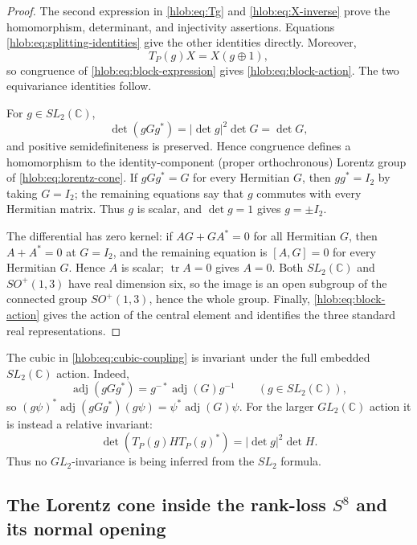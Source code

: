 \begin{proof}
The second expression in \eqref{hlob:eq:Tg} and
\eqref{hlob:eq:X-inverse} prove the homomorphism, determinant, and
injectivity assertions.  Equations \eqref{hlob:eq:splitting-identities}
give the other identities directly.  Moreover,
\[
 T_P(g)X=X(g\oplus1),
\]
so congruence of \eqref{hlob:eq:block-expression} gives
\eqref{hlob:eq:block-action}.  The two equivariance identities follow.

For \(g\in SL_2(\mathbb C)\),
\[
 \det(gGg^*)=|\det g|^2\det G=\det G,
\]
and positive semidefiniteness is preserved.  Hence congruence defines a
homomorphism to the identity-component (proper orthochronous) Lorentz group of
\eqref{hlob:eq:lorentz-cone}.  If \(gGg^*=G\) for every Hermitian \(G\),
then \(gg^*=I_2\) by taking \(G=I_2\); the remaining equations say that \(g\)
commutes with every Hermitian matrix.  Thus \(g\) is scalar, and
\(\det g=1\) gives \(g=\pm I_2\).

The differential has zero kernel: if
\(AG+GA^*=0\) for all Hermitian \(G\), then \(A+A^*=0\) at \(G=I_2\), and
the remaining equation is \([A,G]=0\) for every Hermitian \(G\).  Hence \(A\)
is scalar; \(\operatorname{tr}A=0\) gives \(A=0\).  Both
\(SL_2(\mathbb C)\) and \(SO^+(1,3)\) have real dimension six, so the image
is an open subgroup of the connected group \(SO^+(1,3)\), hence the whole
group.  Finally, \eqref{hlob:eq:block-action} gives the action of the
central element and identifies the three standard real representations.
\end{proof}

The cubic in \eqref{hlob:eq:cubic-coupling} is invariant under the full
embedded \(SL_2(\mathbb C)\) action.  Indeed,
\begin{equation}
 \operatorname{adj}(gGg^*)=g^{-*}\operatorname{adj}(G)g^{-1}
 \qquad(g\in SL_2(\mathbb C)),
 \label{hlob:eq:adjugate-covariance}
\end{equation}
so
\((g\psi)^*\operatorname{adj}(gGg^*)(g\psi)
=\psi^*\operatorname{adj}(G)\psi\).
For the larger \(GL_2(\mathbb C)\) action it is instead a relative invariant:
\begin{equation}
 \det\!\left(T_P(g)HT_P(g)^*\right)
 =|\det g|^2\det H.
 \label{hlob:eq:GL2-relative-invariant}
\end{equation}
Thus no \(GL_2\)-invariance is being inferred from the \(SL_2\) formula.

\subsection{The Lorentz cone inside the rank-loss
\texorpdfstring{\(S^8\)}{S8} and its normal opening}
\label{hlob:subsec:S8}

